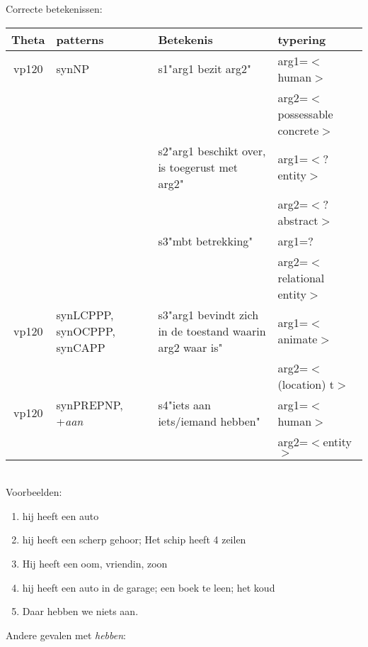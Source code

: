 Correcte betekenissen:

\begin{tabular}[t]{|c|p{}|p{}|p{}|}
\hline
Theta & patterns & Betekenis             & typering\\
\hline
vp120 & synNP    & s1"arg1 bezit arg2"     & arg1=$<$human$>$\\
      &          &                       & arg2=$<$possessable concrete$>$ \\
      &          & s2"arg1 beschikt over,
                   is toegerust met arg2"& arg1=$<$?entity$>$\\
      &          &                       & arg2=$<$?abstract$>$\\
      &          & s3"mbt betrekking"    & arg1=?\\
      &          &                       & arg2=$<$relational entity$>$\\
\hline
vp120 & synLCPPP,
        synOCPPP,
        synCAPP  & s3"arg1 bevindt zich in
                    de toestand waarin
                    arg2 waar is"        & arg1=$<$animate$>$\\
      &          &                       & arg2=$<$(location) t$>$\\
\hline
vp120 & synPREPNP,
        +{\em aan}
                 & s4"iets aan iets/iemand hebben" & arg1=$<$human$>$\\
      &          &                                 & arg2=$<$entity$>$\\
\hline
\end{tabular}\\

Voorbeelden:
\begin{enumerate}
  \item hij heeft een auto
  \item hij heeft een scherp gehoor;   Het schip heeft 4 zeilen
  \item Hij heeft een oom, vriendin, zoon
  \item hij heeft een auto in de garage; een boek te leen; het koud
  \item Daar hebben we niets aan.
\end{enumerate}

Andere gevalen met {\em hebben}:

